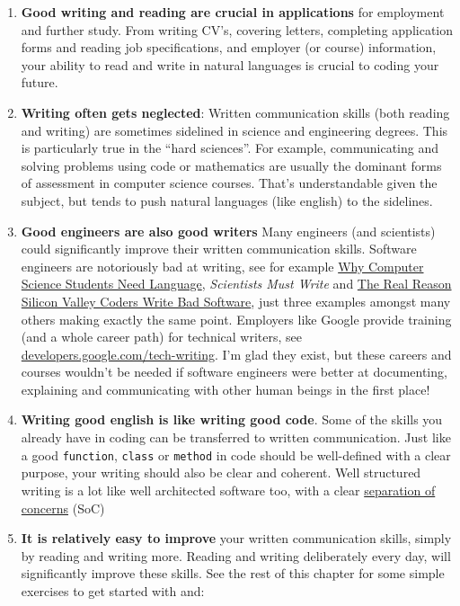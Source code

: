 \documentclass[
]{book}
\providecommand{\tightlist}{%
  \setlength{\itemsep}{0pt}\setlength{\parskip}{0pt}}
\begin{document}
\begin{enumerate}
\def\labelenumi{\arabic{enumi}.}
\tightlist
\item
  \textbf{Good writing and reading are crucial in applications} for employment and further study. From writing CV's, covering letters, completing application forms and reading job specifications, and employer (or course) information, your ability to read and write in natural languages is crucial to coding your future.
\item
  \textbf{Writing often gets neglected}: Written communication skills (both reading and writing) are sometimes sidelined in science and engineering degrees. This is particularly true in the ``hard sciences''. For example, communicating and solving problems using code or mathematics are usually the dominant forms of assessment in computer science courses. That's understandable given the subject, but tends to push natural languages (like english) to the sidelines.
\item
  \textbf{Good engineers are also good writers} Many engineers (and scientists) could significantly improve their written communication skills. Software engineers are notoriously bad at writing, see for example \href{https://dl.acm.org/doi/10.1145/960492.960525}{Why Computer Science Students Need Language}, \citep{Beaubouef2003} \emph{Scientists Must Write} \citep{scientistsmustwrite} and \href{https://www.theatlantic.com/national/archive/2012/10/the-real-reason-silicon-valley-coders-write-bad-software/263377/}{The Real Reason Silicon Valley Coders Write Bad Software}, \citep{writebadsoftware} just three examples amongst many others making exactly the same point. Employers like Google provide training (and a whole career path) for technical writers, see \href{https://developers.google.com/tech-writing}{developers.google.com/tech-writing}. I'm glad they exist, but these careers and courses wouldn't be needed if software engineers were better at documenting, explaining and communicating with other human beings in the first place!
\item
  \textbf{Writing good english is like writing good code}. Some of the skills you already have in coding can be transferred to written communication. Just like a good \texttt{function}, \texttt{class} or \texttt{method} in code should be well-defined with a clear purpose, your writing should also be clear and coherent. Well structured writing is a lot like well architected software too, with a clear \href{https://en.wikipedia.org/wiki/Separation_of_concerns}{separation of concerns} (SoC)
\item
  \textbf{It is relatively easy to improve} your written communication skills, simply by reading and writing more. Reading and writing deliberately every day, will significantly improve these skills. See the rest of this chapter for some simple exercises to get started with and:


\end{enumerate}
\end{document}
